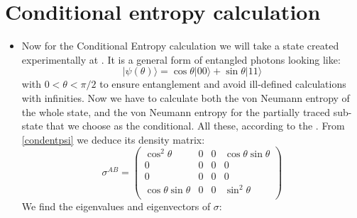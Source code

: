 \section{Conditional entropy calculation}
\begin{itemize}
\label{sectioncondcalc}
\item
Now for the Conditional Entropy calculation we will take a state created experimentally at \cite{gomez2019experimental}. It is a general form of entangled photons looking like:
\begin{equation}
|\psi(\theta)\rangle=\cos \theta|00\rangle+\sin \theta |11\rangle
\label{condentpsi}
\end{equation}
with $0< \theta< \pi /2$ to ensure entanglement and avoid ill-defined calculations with infinities.
Now we have to calculate both the von Neumann entropy of the whole state, and the von Neumann entropy for the partially traced sub-state that we choose as the conditional. All these, according to the .
From \eqref{condentpsi} we deduce its density matrix:
\begin{equation}
\label{sigmastate}
\sigma^{AB}=\left(
\begin{array}{cccc}
 \cos ^2 \theta & 0 & 0 & \cos \theta \sin \theta \\
 0 & 0 & 0 & 0 \\
 0 & 0 & 0 & 0 \\
 \cos \theta \sin \theta & 0 & 0 & \sin ^2 \theta  \\
\end{array}
\right)
\end{equation}
We find the eigenvalues and eigenvectors of $\sigma$:


\end{itemize}
